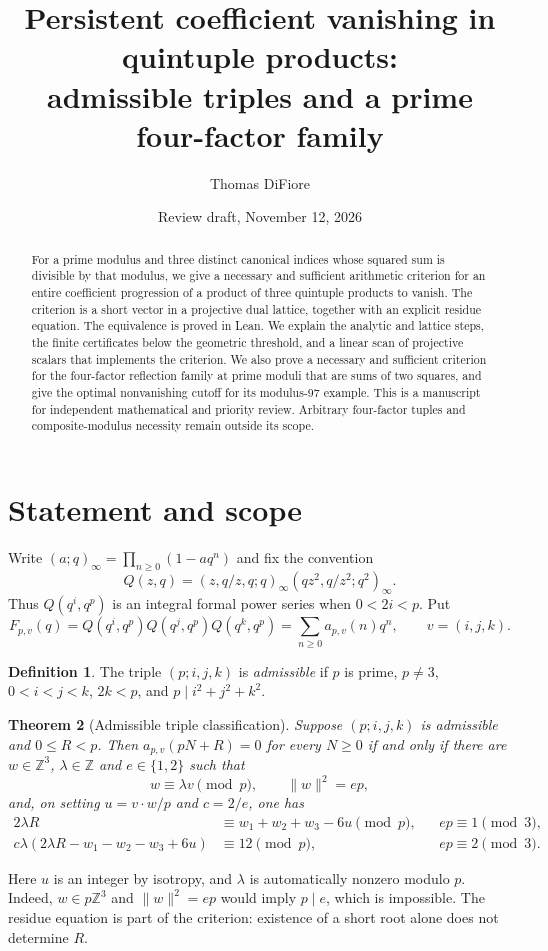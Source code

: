 \documentclass[11pt]{amsart}
\title[Vanishing in quintuple products]{Persistent coefficient vanishing in quintuple products:\\ admissible triples and a prime four-factor family}
\author{Thomas DiFiore}
\date{Review draft, November 12, 2026}
\newcommand{\Z}{\mathbb Z}
\newcommand{\norm}[1]{\lVert#1\rVert}
\newtheorem{theorem}{Theorem}
\theoremstyle{definition}
\newtheorem{definition}[theorem]{Definition}
\begin{document}
\begin{abstract}
For a prime modulus and three distinct canonical indices whose squared sum
is divisible by that modulus, we give a necessary and sufficient arithmetic
criterion for an entire coefficient progression of a product of three
quintuple products to vanish. The criterion is a short vector in a projective
dual lattice, together with an explicit residue equation. The equivalence
is proved in Lean. We explain the analytic and lattice steps, the finite
certificates below the geometric threshold, and a linear scan of projective
scalars that implements the criterion. We also prove a necessary and sufficient criterion for the four-factor
reflection family at prime moduli that are sums of two squares, and give
the optimal nonvanishing cutoff for its modulus-97 example. This is a
manuscript for independent mathematical and priority review. Arbitrary
four-factor tuples and composite-modulus necessity remain outside its scope.
\end{abstract}
\maketitle

\section{Statement and scope}
Write $(a;q)_\infty=\prod_{n\ge0}(1-aq^n)$ and fix the convention
\[
 Q(z,q)=(z,q/z,q;q)_\infty(qz^2,q/z^2;q^2)_\infty.
\]
Thus $Q(q^i,q^p)$ is an integral formal power series when $0<2i<p$.
Put
\[
 F_{p,v}(q)=Q(q^i,q^p)Q(q^j,q^p)Q(q^k,q^p)
       =\sum_{n\ge0}a_{p,v}(n)q^n,\qquad v=(i,j,k).
\]
\begin{definition}
The triple $(p;i,j,k)$ is \emph{admissible} if $p$ is prime, $p\ne3$,
$0<i<j<k$, $2k<p$, and $p\mid i^2+j^2+k^2$.
\end{definition}

\begin{theorem}[Admissible triple classification]\label{thm:main}
Suppose $(p;i,j,k)$ is admissible and $0\le R<p$.
Then $a_{p,v}(pN+R)=0$ for every $N\ge0$ if and only if there are
$w\in\Z^3$, $\lambda\in\Z$ and $e\in\{1,2\}$ such that
\[
 w\equiv\lambda v\pmod p,\qquad \norm{w}^2=ep,
\]
and, on setting $u=v\cdot w/p$ and $c=2/e$, one has
\begin{align}
 2\lambda R&\equiv w_1+w_2+w_3-6u\pmod p,
       &&ep\equiv1\pmod3,\label{eq:target1}\\
 c\lambda(2\lambda R-w_1-w_2-w_3+6u)&\equiv12\pmod p,
       &&ep\equiv2\pmod3.\label{eq:target2}
\end{align}
\end{theorem}
Here $u$ is an integer by isotropy, and $\lambda$ is automatically nonzero
modulo $p$. Indeed, $w\in p\Z^3$ and $\norm{w}^2=ep$ would imply
$p\mid e$, which is impossible. The residue equation is part of the
criterion: existence of a short root alone does not determine $R$.
\end{document}
